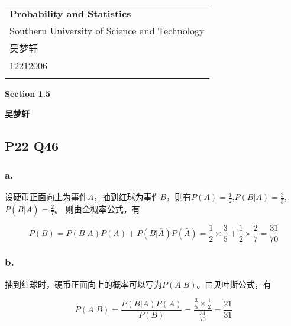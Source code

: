 \documentclass[a4paper,12pt]{ctexart}
\begin{document}
\thispagestyle{empty} %

\begin{tabular}{p{15.5cm}}
{\large \bf Probability and Statistics} \\
Southern University of Science and Technology \\ 吴梦轩 \\ 12212006 \\
\hline
\\
\end{tabular}

\vspace*{0.3cm} %

\begin{center}
	{\Large \bf Section 1.5}
	\vspace{2mm}

	{\bf 吴梦轩}
		
\end{center}  

\vspace{0.4cm}

\subsection*{P22 Q46}

\subsubsection*{a.}

设硬币正面向上为事件$A$，抽到红球为事件$B$，则有$P(A) = \frac{1}{2}$,$P(B|A)=\frac{3}{5}$,$P(B|\bar{A})=\frac{2}{7}$。
则由全概率公式，有

\begin{equation*}
	P(B) = P(B|A)P(A) + P(B|\bar{A})P(\bar{A}) = \frac{1}{2} \times \frac{3}{5} + \frac{1}{2} \times \frac{2}{7} = \frac{31}{70}
\end{equation*}

\subsubsection*{b.}

抽到红球时，硬币正面向上的概率可以写为$P(A|B)$。由贝叶斯公式，有

\begin{equation*}
	P(A|B) = \frac{P(B|A)P(A)}{P(B)} = \frac{\frac{3}{5} \times \frac{1}{2}}{\frac{31}{70}} = \frac{21}{31}
\end{equation*}
\end{document}
